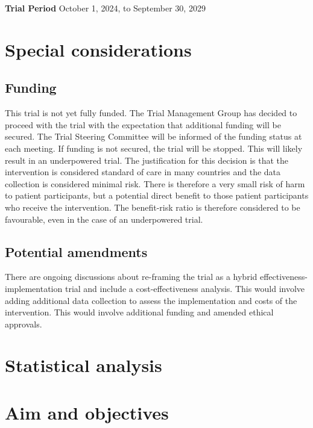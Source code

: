\documentclass[
]{scrartcl}
\begin{document}
\textbf{Trial Period} October 1, 2024, to September 30, 2029

\newpage{}

\hypertarget{special-considerations}{%
\section{Special considerations}\label{special-considerations}}

\hypertarget{funding}{%
\subsection{Funding}\label{funding}}

This trial is not yet fully funded. The Trial Management Group has
decided to proceed with the trial with the expectation that additional
funding will be secured. The Trial Steering Committee will be informed
of the funding status at each meeting. If funding is not secured, the
trial will be stopped. This will likely result in an underpowered trial.
The justification for this decision is that the intervention is
considered standard of care in many countries and the data collection is
considered minimal risk. There is therefore a very small risk of harm to
patient participants, but a potential direct benefit to those patient
participants who receive the intervention. The benefit-risk ratio is
therefore considered to be favourable, even in the case of an
underpowered trial.

\hypertarget{potential-amendments}{%
\subsection{Potential amendments}\label{potential-amendments}}

There are ongoing discussions about re-framing the trial as a hybrid
effectiveness-implementation trial and include a cost-effectiveness
analysis. This would involve adding additional data collection to assess
the implementation and costs of the intervention. This would involve
additional funding and amended ethical approvals.

\newpage{}

\hypertarget{statistical-analysis}{%
\section{Statistical analysis}\label{statistical-analysis}}

\hypertarget{aim-and-objectives}{%
\section{Aim and objectives}\label{aim-and-objectives}}
\end{document}
